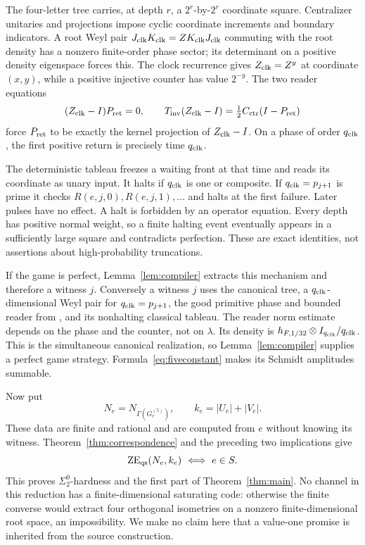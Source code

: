 The four-letter tree carries, at depth $r$, a $2^r$-by-$2^r$ coordinate square. Centralizer unitaries and projections impose cyclic coordinate increments and boundary indicators. A root Weyl pair $J_{\rm clk}K_{\rm clk}=ZK_{\rm clk}J_{\rm clk}$ commuting with the root density has a nonzero finite-order phase sector; its determinant on a positive density eigenspace forces this. The clock recurrence gives $Z_{\rm clk}=Z^y$ at coordinate $(x,y)$, while a positive injective counter has value $2^{-y}$. The two reader equations
\[
 (Z_{\rm clk}-I)P_{\rm ret}=0,\qquad
 T_{\rm inv}(Z_{\rm clk}-I)=\tfrac12C_{\rm ctr}(I-P_{\rm ret})
\]
force $P_{\rm ret}$ to be exactly the kernel projection of $Z_{\rm clk}-I$. On a phase of order $q_{\mathrm{clk}}$, the first positive return is precisely time $q_{\mathrm{clk}}$.

The deterministic tableau freezes a waiting front at that time and reads its coordinate as unary input. It halts if $q_{\mathrm{clk}}$ is one or composite. If $q_{\mathrm{clk}}=p_{j+1}$ is prime it checks $R(e,j,0),R(e,j,1),\ldots$ and halts at the first failure. Later pulses have no effect. A halt is forbidden by an operator equation. Every depth has positive normal weight, so a finite halting event eventually appears in a sufficiently large square and contradicts perfection. These are exact identities, not assertions about high-probability truncations.

If the game is perfect, Lemma~\ref{lem:compiler} extracts this mechanism and therefore a witness $j$. Conversely a witness $j$ uses the canonical tree, a $q_{\mathrm{clk}}$-dimensional Weyl pair for $q_{\mathrm{clk}}=p_{j+1}$, the good primitive phase and bounded reader from \cite[Section~6]{Sigma2}, and its nonhalting classical tableau. The reader norm estimate depends on the phase and the counter, not on $\lambda$. Its density is $h_{F,1/32}\otimes I_{q_{\mathrm{clk}}}/q_{\mathrm{clk}}$. This is the simultaneous canonical realization, so Lemma~\ref{lem:compiler} supplies a perfect game strategy. Formula~\eqref{eq:fiveconstant} makes its Schmidt amplitudes summable.

Now put
\[
 N_e=N_{\Gamma(G_e^{(5)})},\qquad
 k_e=|U_e|+|V_e|.
\]
These data are finite and rational and are computed from $e$ without knowing its witness. Theorem~\ref{thm:correspondence} and the preceding two implications give
\[
 \mathrm{ZE}_{\mathrm{qs}}(N_e,k_e)\ \Longleftrightarrow\ e\in S.
\]
This proves $\Sigma^0_2$-hardness and the first part of Theorem~\ref{thm:main}. No channel in this reduction has a finite-dimensional saturating code: otherwise the finite converse would extract four orthogonal isometries on a nonzero finite-dimensional root space, an impossibility. We make no claim here that a value-one promise is inherited from the source construction.

